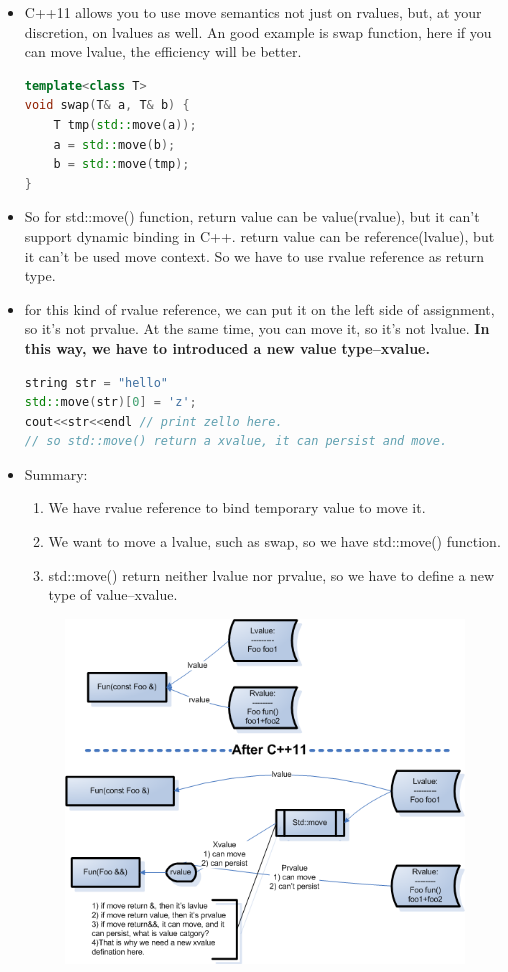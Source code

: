 \documentclass[a4paper,11pt,twoside]{book}
\begin{document}
\begin{itemize}
	\item C++11 allows you to use move semantics not just on rvalues, but, at your discretion, on lvalues as well. An good example is swap function, here if you can move lvalue, the efficiency will be better. 
	
\begin{lstlisting}[frame=single, language=c++, mathescape=true]
template<class T> 
void swap(T& a, T& b) { 
	T tmp(std::move(a));
	a = std::move(b); 
	b = std::move(tmp);
} 
	\end{lstlisting}
	
	\item So for std::move() function, return value can be value(rvalue), but it can't support dynamic binding in C++.  return value can be reference(lvalue), but it can't be used move context. So we have to use rvalue reference as return type. 
	
	\item for this kind of rvalue reference, we can put it on the left side of assignment, so it's not prvalue. At the same time, you can move it, so it's not lvalue.  \textbf{In this way, we have to introduced a new value type--xvalue.}    
\begin{lstlisting}[frame=single, language=c++, mathescape=true]
string str = "hello"
std::move(str)[0] = 'z';
cout<<str<<endl // print zello here.
// so std::move() return a xvalue, it can persist and move.
\end{lstlisting}
	
	\item Summary:
	\begin{enumerate}
		\item We have rvalue reference to bind temporary value to move it.
		\item We want to move a lvalue, such as swap, so we have std::move() function.
		\item std::move() return neither lvalue nor prvalue, so we have to define a new type of value--xvalue.
	\end{enumerate}

	
	\begin{figure}
		\centering
		\includegraphics[width=0.7\linewidth]{pics/xvalue.png}
		\caption{}
		\label{fig:xvalue}
	\end{figure}	
\end{itemize}
\end{document}
